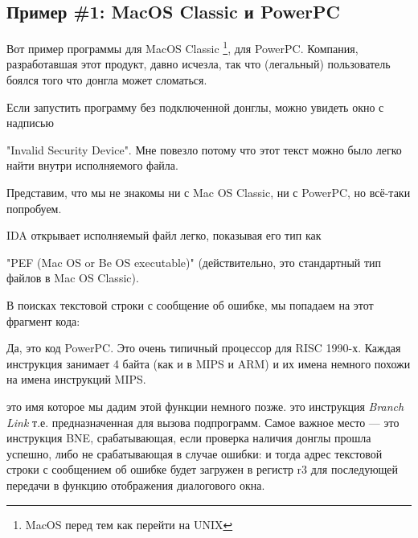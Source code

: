 \newcommand{\PPC}{\InSqBrackets{\emph{PowerPC(tm) Microprocessor Family: The Programming Environments for 32-Bit Microprocessors}, (2000)}\footnote{\AlsoAvailableAs \url{http://yurichev.com/mirrors/PowerPC/6xx_pem.pdf}}}

\newcommand{\PPCABI}{[Steve Zucker, SunSoft and Kari Karhi, IBM, \emph{SYSTEM V APPLICATION BINARY INTERFACE: PowerPC Processor Supplement}, (1995)]\footnote{\AlsoAvailableAs \url{http://yurichev.com/mirrors/PowerPC/elfspec_ppc.pdf}}}

\subsection{Пример \#1: MacOS Classic и PowerPC}

Вот пример программы для MacOS Classic
\footnote{MacOS перед тем как перейти на UNIX}, для PowerPC.
Компания, разработавшая этот продукт, давно исчезла, так что (легальный) пользователь
боялся того что донгла может сломаться.

Если запустить программу без подключенной донглы, можно увидеть окно с надписью

"Invalid Security Device".
Мне повезло потому что этот текст можно было легко найти внутри исполняемого файла.

Представим, что мы не знакомы ни с Mac OS Classic, ни с PowerPC, но всё-таки попробуем.

\ac{IDA} открывает исполняемый файл легко, показывая его тип как
 
"PEF (Mac OS or Be OS executable)" (действительно, это стандартный тип файлов в Mac OS Classic).

В поисках текстовой строки с сообщение об ошибке, мы попадаем на этот фрагмент кода:



Да, это код PowerPC.
Это очень типичный процессор для \ac{RISC} 1990-х.
Каждая инструкция занимает 4 байта (как и в MIPS и ARM) и их имена немного похожи на имена 
инструкций MIPS.

 это имя которое мы дадим этой функции немного позже.
 это инструкция \emph{Branch Link} 
т.е. предназначенная для вызова подпрограмм.
Самое важное место --- это инструкция \ac{BNE}, срабатывающая, если проверка наличия донглы прошла
успешно, либо не срабатывающая в случае ошибки: и тогда адрес текстовой строки с сообщением об ошибке
будет загружен в регистр r3 для последующей передачи в функцию отображения диалогового окна.

